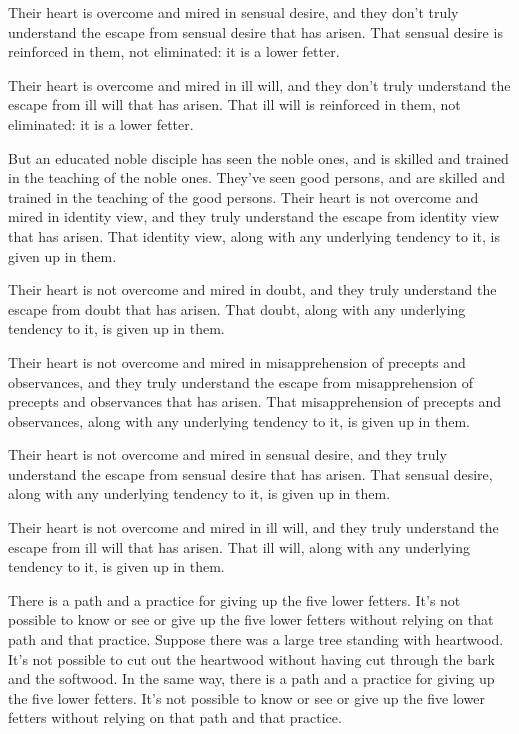 \documentclass[12pt,openany]{book}%
\begin{document}
Their heart is overcome and mired in sensual desire, and they don’t truly understand the escape from sensual desire that has arisen. That sensual desire is reinforced in them, not eliminated: it is a lower fetter. 

Their heart is overcome and mired in ill will, and they don’t truly understand the escape from ill will that has arisen. That ill will is reinforced in them, not eliminated: it is a lower fetter. 

But an educated noble disciple has seen the noble ones, and is skilled and trained in the teaching of the noble ones. They’ve seen good persons, and are skilled and trained in the teaching of the good persons. Their heart is not overcome and mired in identity view, and they truly understand the escape from identity view that has arisen. That identity view, along with any underlying tendency to it, is given up in them. 

Their heart is not overcome and mired in doubt, and they truly understand the escape from doubt that has arisen. That doubt, along with any underlying tendency to it, is given up in them. 

Their heart is not overcome and mired in misapprehension of precepts and observances, and they truly understand the escape from misapprehension of precepts and observances that has arisen. That misapprehension of precepts and observances, along with any underlying tendency to it, is given up in them. 

Their heart is not overcome and mired in sensual desire, and they truly understand the escape from sensual desire that has arisen. That sensual desire, along with any underlying tendency to it, is given up in them. 

Their heart is not overcome and mired in ill will, and they truly understand the escape from ill will that has arisen. That ill will, along with any underlying tendency to it, is given up in them. 

There is a path and a practice for giving up the five lower fetters. It’s not possible to know or see or give up the five lower fetters without relying on that path and that practice. Suppose there was a large tree standing with heartwood. It’s not possible to cut out the heartwood without having cut through the bark and the softwood. In the same way, there is a path and a practice for giving up the five lower fetters. It’s not possible to know or see or give up the five lower fetters without relying on that path and that practice. 
\end{document}
